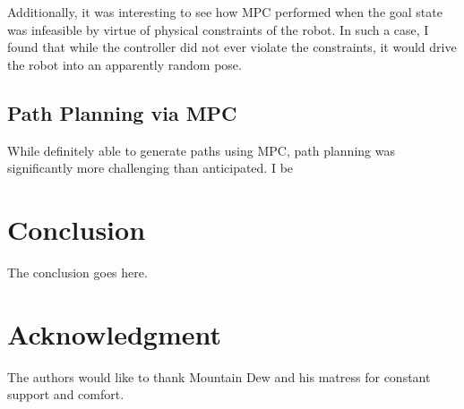 \documentclass[journal]{IEEEtran}
\begin{document}
Additionally, it was interesting to see how MPC performed when the goal state was infeasible by virtue of physical constraints of the robot. In such a case, I found that while the controller did not ever violate the constraints, it would drive the robot into an apparently random pose.


\subsection{Path Planning via MPC}

While definitely able to generate paths using MPC, path planning was significantly more challenging than anticipated. I be



\section{Conclusion}
The conclusion goes here.


%
%


\section*{Acknowledgment}


The authors would like to thank Mountain Dew and his matress for constant support and comfort.



\ifCLASSOPTIONcaptionsoff
  \newpage
\fi



%
%
%
%
\cite{craig_introduction_2005}
\cite{khalil_nonlinear_2002}
\cite{rawlings_model_2017}
\cite{armstrong_explicit_1986}
\cite{ogata_modern_2010}
\cite{meriam_engineering_1993}
\cite{greenwood_advanced_2006}
\cite{borrelli_predictive_2017}
\cite{boyd_convex_2004}
\cite{slotine_applied_1991}
\cite{soft_constraints}
\end{document}
